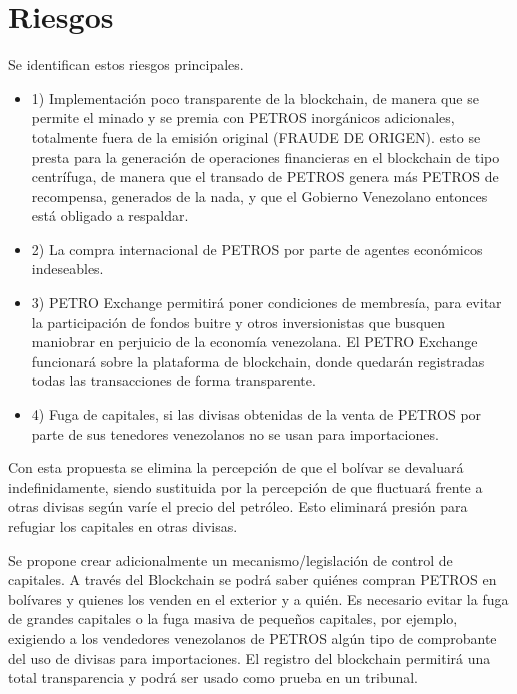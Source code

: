 %
\section{Riesgos}
\label{sec:riesgo}
%
Se identifican estos riesgos principales.
\begin{itemize}

    \item{1)} Implementación poco transparente de la blockchain, de manera que se permite el minado y se premia con PETROS inorgánicos adicionales, totalmente fuera de la emisión original (FRAUDE DE ORIGEN). esto se presta para la generación de operaciones financieras en el blockchain de tipo centrífuga, de manera que el transado de PETROS genera más PETROS de recompensa, generados de la nada, y que el Gobierno Venezolano entonces está obligado a respaldar.
    \item{2)} La compra internacional de PETROS por parte de agentes económicos indeseables.
    \item{3)} PETRO Exchange permitirá poner condiciones de membresía, para evitar la participación de fondos buitre y otros inversionistas que busquen maniobrar en perjuicio de la economía venezolana. El PETRO Exchange funcionará sobre la plataforma de blockchain, donde quedarán registradas todas las transacciones de forma transparente.
    \item{4)} Fuga de capitales, si las divisas obtenidas de la venta de PETROS por parte de sus tenedores venezolanos no se usan para importaciones.
\end{itemize}

Con esta propuesta se elimina la percepción de que el bolívar se devaluará indefinidamente, siendo sustituida por la percepción de que fluctuará frente a otras divisas según varíe el precio del petróleo. Esto eliminará presión para refugiar los capitales en otras divisas.

Se propone crear adicionalmente un mecanismo/legislación de control de capitales. A través del Blockchain se podrá saber quiénes compran PETROS en bolívares y quienes los venden en el exterior y a quién. Es necesario evitar la fuga de grandes capitales o la fuga masiva de pequeños capitales, por ejemplo, exigiendo a los vendedores venezolanos de PETROS algún tipo de comprobante del uso de divisas para importaciones. El registro del blockchain permitirá una total transparencia y podrá ser usado como prueba en un tribunal.